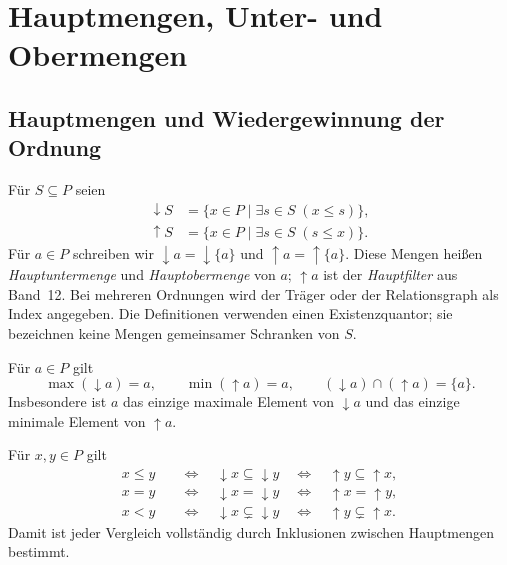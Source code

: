 \chapter{Hauptmengen, Unter- und Obermengen}
\label{b12guide:ch:order-sets}

\section{Hauptmengen und Wiedergewinnung der Ordnung}

\begin{definition}
\label{b12guide:def:closures}
Für $S\subseteq P$ seien
\[
\begin{aligned}
 \downarrow S&=\{x\in P\mid\exists s\in S\;(x\leq s)\},\\
 \uparrow S&=\{x\in P\mid\exists s\in S\;(s\leq x)\}.
\end{aligned}
\]
Für $a\in P$ schreiben wir
$\downarrow a=\downarrow\{a\}$ und
$\uparrow a=\uparrow\{a\}$. Diese Mengen heißen
\emph{Hauptuntermenge} und \emph{Hauptobermenge} von $a$;
$\uparrow a$ ist der \emph{Hauptfilter} aus Band~12.
Bei mehreren Ordnungen wird der Träger oder der Relationsgraph
als Index angegeben.
Die Definitionen verwenden einen Existenzquantor; sie bezeichnen
keine Mengen gemeinsamer Schranken von $S$.
\end{definition}

\begin{theorem}
\label{b12guide:thm:principal-extremes}
Für $a\in P$ gilt
\[
 \max(\downarrow a)=a,\qquad
 \min(\uparrow a)=a,\qquad
 (\downarrow a)\cap(\uparrow a)=\{a\}.
\]
Insbesondere ist $a$ das einzige maximale Element von
$\downarrow a$ und das einzige minimale Element von $\uparrow a$.
\end{theorem}

\begin{theorem}
\label{b12guide:thm:principal-recovery}
Für $x,y\in P$ gilt
\[
\begin{aligned}
 x\leq y
 &\quad\Longleftrightarrow\quad\downarrow x\subseteq\downarrow y
 \quad\Longleftrightarrow\quad\uparrow y\subseteq\uparrow x,\\
 x=y
 &\quad\Longleftrightarrow\quad\downarrow x=\downarrow y
 \quad\Longleftrightarrow\quad\uparrow x=\uparrow y,\\
 x<y
 &\quad\Longleftrightarrow\quad\downarrow x\subsetneq\downarrow y
 \quad\Longleftrightarrow\quad\uparrow y\subsetneq\uparrow x.
\end{aligned}
\]
Damit ist jeder Vergleich vollständig durch Inklusionen zwischen
Hauptmengen bestimmt.
\end{theorem}

